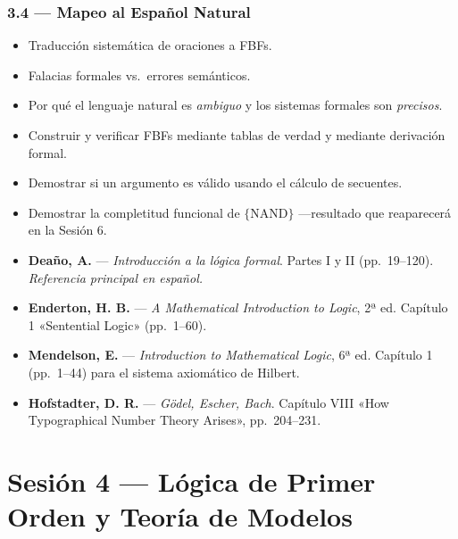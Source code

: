 \documentclass[11pt, letterpaper]{article}
\begin{document}
\subsubsection{3.4 — Mapeo al Español Natural}
\begin{itemize}
  \item Traducción sistemática de oraciones a FBFs.
  \item Falacias formales vs.\ errores semánticos.
  \item Por qué el lenguaje natural es \emph{ambiguo} y los sistemas formales son \emph{precisos}.
\end{itemize}

\begin{objetivos}
\begin{itemize}
  \item Construir y verificar FBFs mediante tablas de verdad y mediante derivación formal.
  \item Demostrar si un argumento es válido usando el cálculo de secuentes.
  \item Demostrar la completitud funcional de $\{\text{NAND}\}$ —resultado que reaparecerá en la Sesión 6.
\end{itemize}
\end{objetivos}

\begin{lecturas}
\begin{itemize}
  \item[$(\star)$] \textbf{Deaño, A.} — \emph{Introducción a la lógica formal}. Partes I y II (pp.\ 19--120). \textit{Referencia principal en español.}
  \item[$(\star)$] \textbf{Enderton, H. B.} — \emph{A Mathematical Introduction to Logic}, 2ª ed. Capítulo 1 «Sentential Logic» (pp.\ 1--60).
  \item \textbf{Mendelson, E.} — \emph{Introduction to Mathematical Logic}, 6ª ed. Capítulo 1 (pp.\ 1--44) para el sistema axiomático de Hilbert.
  \item \textbf{Hofstadter, D. R.} — \emph{Gödel, Escher, Bach}. Capítulo VIII «How Typographical Number Theory Arises», pp.\ 204--231.
\end{itemize}
\end{lecturas}

\newpage

\section{Sesión 4 — Lógica de Primer Orden y Teoría de Modelos}
\end{document}
